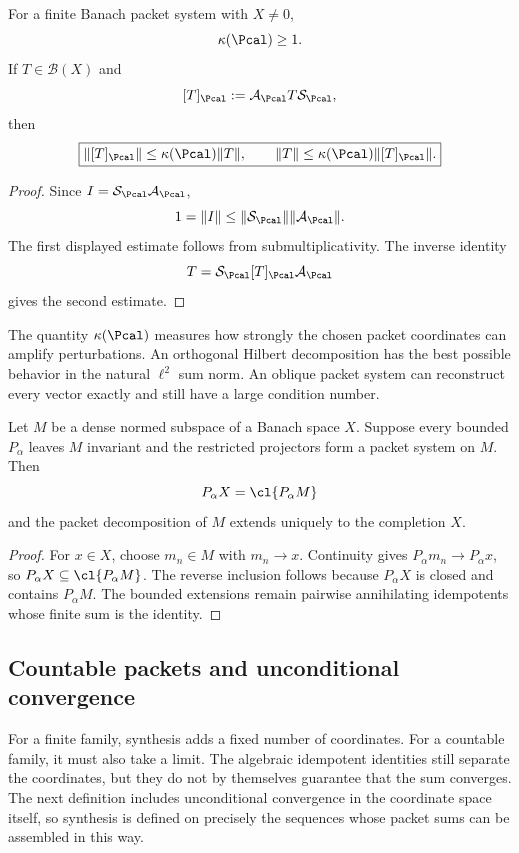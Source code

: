 \begin{proposition}
\label{prop:conditioned-coordinates}
For a finite Banach packet system with $X\ne0$,
\[
\kappa(\Pcal)\geq1.
\]
If $T\in\mathcal B(X)$ and
\[
[T]_{\Pcal}:=\mathcal A_{\Pcal}T\mathcal S_{\Pcal},
\]
then
\[
\boxed{
\|[T]_{\Pcal}\|
\leq\kappa(\Pcal)\|T\|,
\qquad
\|T\|
\leq\kappa(\Pcal)\|[T]_{\Pcal}\|.
}
\]
\end{proposition}

\begin{proof}
Since $I=\mathcal S_{\Pcal}\mathcal A_{\Pcal}$,
\[
1=\|I\|\leq\|\mathcal S_{\Pcal}\|\|\mathcal A_{\Pcal}\|.
\]
The first displayed estimate follows from submultiplicativity.  The inverse identity
\[
T=\mathcal S_{\Pcal}[T]_{\Pcal}\mathcal A_{\Pcal}
\]
gives the second estimate.
\end{proof}

\begin{interpretation}
The quantity \(\kappa(\Pcal)\) measures how strongly the chosen packet coordinates can amplify perturbations.  An orthogonal Hilbert decomposition has the best possible behavior in the natural \(\ell^2\) sum norm.  An oblique packet system can reconstruct every vector exactly and still have a large condition number.
\end{interpretation}


\begin{corollary}
\label{cor:completion-packet-split}
Let $M$ be a dense normed subspace of a Banach space $X$.  Suppose every bounded $P_\alpha$ leaves $M$ invariant and the restricted projectors form a packet system on $M$.  Then
\[
P_\alpha X=\cl{P_\alpha M}
\]
and the packet decomposition of $M$ extends uniquely to the completion $X$.
\end{corollary}

\begin{proof}
For $x\in X$, choose $m_n\in M$ with $m_n\to x$.  Continuity gives $P_\alpha m_n\to P_\alpha x$, so $P_\alpha X\subseteq\cl{P_\alpha M}$.  The reverse inclusion follows because $P_\alpha X$ is closed and contains $P_\alpha M$.  The bounded extensions remain pairwise annihilating idempotents whose finite sum is the identity.
\end{proof}

\subsection{Countable packets and unconditional convergence}
For a finite family, synthesis adds a fixed number of coordinates.  For a countable family, it must also take a limit.  The algebraic idempotent identities still separate the coordinates, but they do not by themselves guarantee that the sum converges.  The next definition includes unconditional convergence in the coordinate space itself, so synthesis is defined on precisely the sequences whose packet sums can be assembled in this way.

